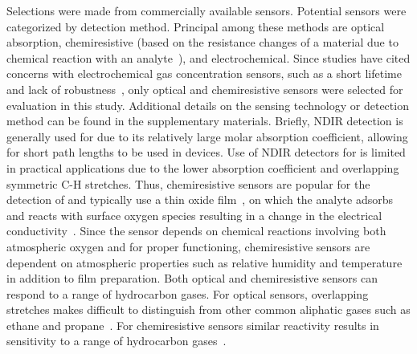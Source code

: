 \documentclass[sensors,article,submit,moreauthors,pdftex]{Definitions/mdpi}
\begin{document}
			Selections were made from commercially available sensors.
			Potential sensors were categorized by detection method.
			Principal among these methods are optical absorption, chemiresistive (based on the resistance changes of a material due to chemical reaction with an analyte~\cite{wetchakun_semiconducting_2011}), and electrochemical.
			Since studies have cited concerns with electrochemical gas concentration sensors, such as a short lifetime and lack of robustness~\cite{neri_first_2015}, only optical and chemiresistive sensors were selected for evaluation in this study.
			Additional details on the sensing technology or detection method can be found in the supplementary materials.
			Briefly, NDIR detection is generally used for  due to its relatively large molar absorption coefficient, allowing for short path lengths to be used in devices.
			Use of NDIR detectors for  is limited in practical applications due to the lower absorption coefficient and overlapping symmetric C-H stretches.
			Thus, chemiresistive sensors are popular for the detection of  and typically use a thin oxide film~\cite{neri_first_2015}, on which the analyte adsorbs and reacts with surface oxygen species resulting in a change in the electrical conductivity~\cite{albert_cross-reactive_2000, wang_metal_2010,prudenziati_thick-film_1986}.
			Since the sensor depends on chemical reactions involving both atmospheric oxygen and  for proper functioning, chemiresistive sensors are dependent on atmospheric properties such as relative humidity and temperature in addition to film preparation.
			Both optical and chemiresistive  sensors can respond to a range of hydrocarbon gases.
			For optical sensors, overlapping stretches makes  difficult to distinguish from other common aliphatic gases such as ethane and propane~\cite{coblentz_society_inc._evaluated_????}.
			For chemiresistive sensors similar reactivity results in sensitivity to a range of hydrocarbon gases~\cite{sekhar_development_2016}.
			
\end{document}
